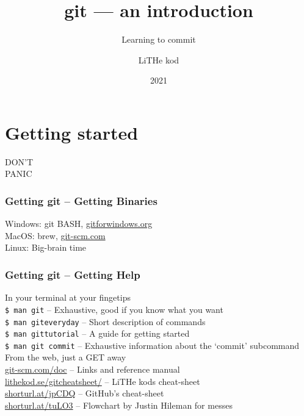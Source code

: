 \documentclass{beamer}
\title[git]{git --- an introduction}
\subtitle{Learning to commit}
\author{LiTHe kod}
\date{2021}
\begin{document}
\frame{\titlepage}

\section{Getting started}

\begin{frame}[fragile]
  \begin{center}
  \Huge \alert{DON'T\\PANIC}
  \end{center}
\end{frame}

\begin{frame}[fragile]
  \frametitle{Getting git -- Getting Binaries}
  
  Windows: git BASH, \url{gitforwindows.org}\\
  MacOS: brew, \url{git-scm.com}\\
  Linux: Big-brain time\\

\end{frame}

\begin{frame}[fragile]
  \frametitle{Getting git -- Getting Help}
  
  \vspace{1em}
  In your terminal at your fingetips \\
  \hspace{1em} \texttt{\$ man git} -- Exhaustive, good if you know what you want \\
  \hspace{1em} \texttt{\$ man giteveryday} -- Short description of commands \\
  \hspace{1em} \texttt{\$ man gittutorial} -- A guide for getting started \\
  \hspace{1em} \texttt{\$ man git commit} -- Exhaustive information about the `commit' subcommand\\
  \vspace{1em}
  From the web, just a GET away \\
  \hspace{1em} \url{git-scm.com/doc} -- Links and reference manual \\
  \hspace{1em} \url{lithekod.se/gitcheatsheet/} -- LiTHe kods cheat-sheet \\
  \hspace{1em} \url{shorturl.at/jpCDQ} -- GitHub's cheat-sheet \\
  \hspace{1em} \url{shorturl.at/tuLO3} -- Flowchart by Justin Hileman for messes\\
    
\end{frame}
\end{document}
